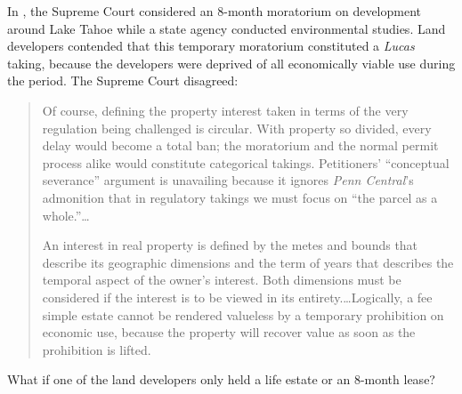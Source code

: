 In , the Supreme Court considered an 8-month moratorium on
development around Lake Tahoe while a state agency conducted environmental
studies. Land developers contended that this temporary moratorium constituted a
\emph{Lucas} taking, because the developers were deprived of all economically
viable use during the period. The Supreme Court disagreed:
\begin{quotation}
Of course, defining the property interest taken in terms of the very regulation
being challenged is circular. With property so divided, every delay would become
a total ban; the moratorium and the normal permit process alike would constitute
categorical takings. Petitioners' ``conceptual severance'' argument is
unavailing because it ignores \emph{Penn Central}'s admonition that in
regulatory takings we must focus on ``the parcel as a whole.''\ldots

An interest in real property is defined by the metes and bounds that describe
its geographic dimensions and the term of years that describes the temporal
aspect of the owner's interest. Both dimensions must be considered if the
interest is to be viewed in its entirety.\ldots Logically, a fee simple estate
cannot be rendered valueless by a temporary prohibition on economic use, because
the property will recover value as soon as the prohibition is lifted.
\end{quotation}
What if one of the land developers only held a life estate or an 8-month lease?

